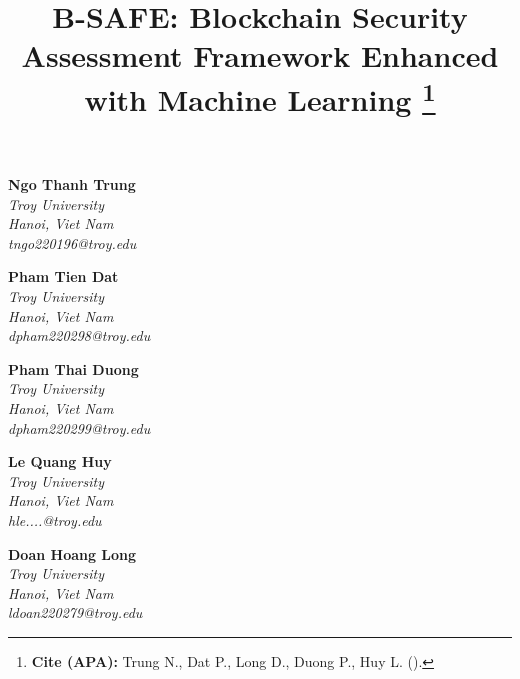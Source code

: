 \documentclass[a4paper]{article}
\title{
    \textbf{B-SAFE: Blockchain Security Assessment Framework Enhanced with Machine Learning} 
    \thanks{
        \sloppy
        \textbf{Cite (APA):} Trung N., Dat P., Long D., Duong P., Huy L. (\the\year).
    }
}
\date{} %
\begin{document}
\maketitle
\vspace{-1.5cm}

\begin{multicols}{3}
    \centering
    \textbf{Ngo Thanh Trung}\\
    \textit{Troy University}\\
    \textit{Hanoi, Viet Nam}\\
    \textit{tngo220196@troy.edu}
	\vfill

    \textbf{Pham Tien Dat}\\
    \textit{Troy University}\\
    \textit{Hanoi, Viet Nam}\\
    \textit{dpham220298@troy.edu}
	\vfill

    \columnbreak

    \textbf{Pham Thai Duong}\\
    \textit{Troy University}\\
    \textit{Hanoi, Viet Nam}\\
    \textit{dpham220299@troy.edu}
	\vfill

    \textbf{Le Quang Huy}\\
    \textit{Troy University}\\
    \textit{Hanoi, Viet Nam}\\
    \textit{hle....@troy.edu}
	\vfill

    \columnbreak

    \textbf{Doan Hoang Long}\\
    \textit{Troy University}\\
    \textit{Hanoi, Viet Nam}\\
    \textit{ldoan220279@troy.edu}
	\vfill
\end{multicols}

\singlespacing
\setlength{\parskip}{6pt}
\setlength{\parindent}{0.5cm}

\end{document}
